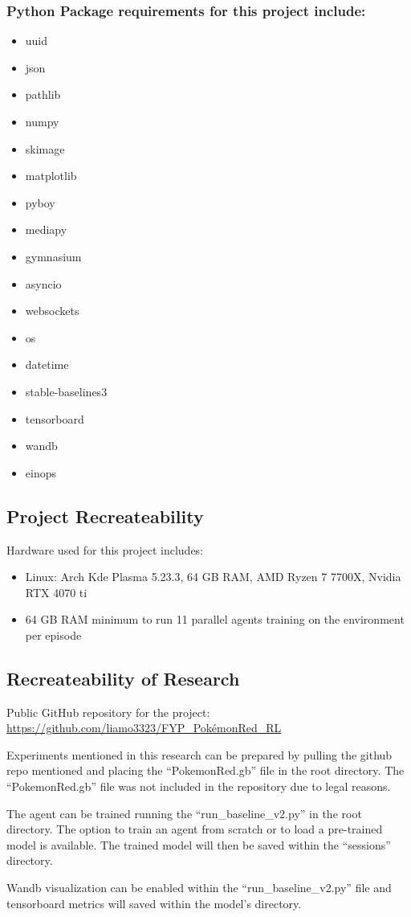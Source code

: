 \subsubsection*{Python Package requirements for this project include: }

\begin{multicols}{2}
\begin{itemize}
    \item uuid
    \item json
    \item pathlib
    \item numpy
    \item skimage
    \item matplotlib
    \item pyboy
    \item mediapy
    \item gymnasium
    \item asyncio
    \item websockets
    \item os
    \item datetime
    \item stable-baselines3
    \item tensorboard
    \item wandb
    \item einops
\end{itemize}
\end{multicols}

\subsection{Project Recreateability}\label{subsec:Hardware}

Hardware used for this project includes:
\begin{itemize}
    \item Linux: Arch Kde Plasma 5.23.3, 64 GB RAM, AMD Ryzen 7 7700X, Nvidia RTX 4070 ti
    \item 64 GB RAM minimum to run 11 parallel agents training on the environment per episode

\end{itemize}

\subsection{Recreateability of Research}

Public GitHub repository for the project: \url{https://github.com/liamo3323/FYP_PokémonRed_RL}

Experiments mentioned in this research can be prepared by pulling the github repo mentioned and placing the ``PokemonRed.gb'' file in the root directory. The ``PokemonRed.gb'' file was not included in the repository due to legal reasons. 

The agent can be trained running the ``run\_baseline\_v2.py'' in the root directory. The option to train an agent from scratch or to load a pre-trained model is available. The trained model will then be saved within the ``sessions'' directory.

Wandb visualization can be enabled within the ``run\_baseline\_v2.py'' file and tensorboard metrics will saved within the model's directory.